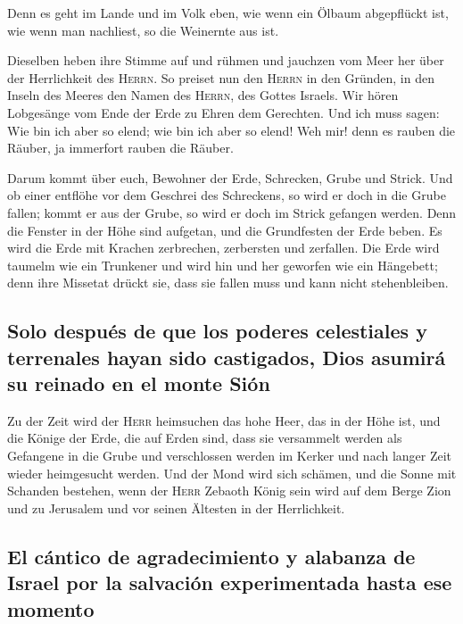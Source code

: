  Denn es geht im Lande und im Volk eben, wie wenn ein
Ölbaum abgepflückt ist, wie wenn man nachliest, so die Weinernte aus
ist.

 Dieselben heben ihre Stimme auf und rühmen und jauchzen
vom Meer her über der Herrlichkeit des \textsc{Herrn}. 
So preiset nun den \textsc{Herrn} in den Gründen, in den Inseln des
Meeres den Namen des \textsc{Herrn}, des Gottes Israels. 
Wir hören Lobgesänge vom Ende der Erde zu Ehren dem Gerechten. Und ich
muss sagen: Wie bin ich aber so elend; wie bin ich aber so elend! Weh
mir! denn es rauben die Räuber, ja immerfort rauben die Räuber.

 Darum kommt über euch, Bewohner der Erde, Schrecken,
Grube und Strick.  Und ob einer entflöhe vor dem Geschrei
des Schreckens, so wird er doch in die Grube fallen; kommt er aus der
Grube, so wird er doch im Strick gefangen werden. Denn die Fenster in
der Höhe sind aufgetan, und die Grundfesten der Erde beben.
 Es wird die Erde mit Krachen zerbrechen, zerbersten und
zerfallen.  Die Erde wird taumelm wie ein Trunkener und
wird hin und her geworfen wie ein Hängebett; denn ihre Missetat drückt
sie, dass sie fallen muss und kann nicht stehenbleiben.

\hypertarget{solo-despuuxe9s-de-que-los-poderes-celestiales-y-terrenales-hayan-sido-castigados-dios-asumiruxe1-su-reinado-en-el-monte-siuxf3n}{%
\subsection{Solo después de que los poderes celestiales y terrenales
hayan sido castigados, Dios asumirá su reinado en el monte
Sión}\label{solo-despuuxe9s-de-que-los-poderes-celestiales-y-terrenales-hayan-sido-castigados-dios-asumiruxe1-su-reinado-en-el-monte-siuxf3n}}

 Zu der Zeit wird der \textsc{Herr} heimsuchen das hohe
Heer, das in der Höhe ist, und die Könige der Erde, die auf Erden sind,
 dass sie versammelt werden als Gefangene in die Grube
und verschlossen werden im Kerker und nach langer Zeit wieder
heimgesucht werden.  Und der Mond wird sich schämen, und
die Sonne mit Schanden bestehen, wenn der \textsc{Herr} Zebaoth König
sein wird auf dem Berge Zion und zu Jerusalem und vor seinen Ältesten in
der Herrlichkeit.

\hypertarget{el-cuxe1ntico-de-agradecimiento-y-alabanza-de-israel-por-la-salvaciuxf3n-experimentada-hasta-ese-momento}{%
\subsection{El cántico de agradecimiento y alabanza de Israel por la
salvación experimentada hasta ese
momento}\label{el-cuxe1ntico-de-agradecimiento-y-alabanza-de-israel-por-la-salvaciuxf3n-experimentada-hasta-ese-momento}}

